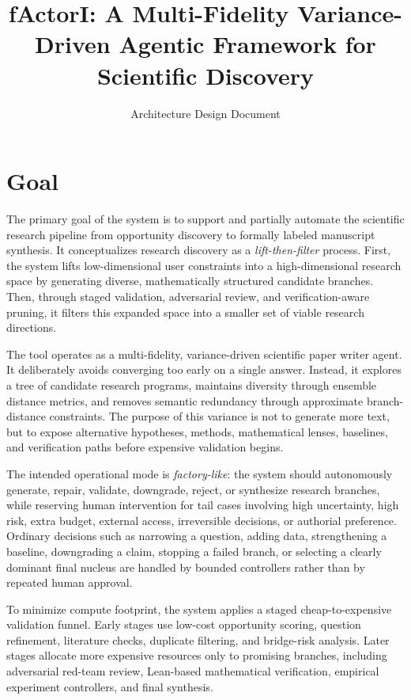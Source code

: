 \documentclass[11pt]{article}
\title{fActorI: A Multi-Fidelity Variance-Driven Agentic Framework for Scientific Discovery}
\author{Architecture Design Document}
\date{}
\begin{document}
\maketitle

\section{Goal}

The primary goal of the system is to support and partially automate the scientific research pipeline from opportunity discovery to formally labeled manuscript synthesis. It conceptualizes research discovery as a \emph{lift-then-filter} process. First, the system lifts low-dimensional user constraints into a high-dimensional research space by generating diverse, mathematically structured candidate branches. Then, through staged validation, adversarial review, and verification-aware pruning, it filters this expanded space into a smaller set of viable research directions.

The tool operates as a multi-fidelity, variance-driven scientific paper writer agent. It deliberately avoids converging too early on a single answer. Instead, it explores a tree of candidate research programs, maintains diversity through ensemble distance metrics, and removes semantic redundancy through approximate branch-distance constraints. The purpose of this variance is not to generate more text, but to expose alternative hypotheses, methods, mathematical lenses, baselines, and verification paths before expensive validation begins.

The intended operational mode is \emph{factory-like}: the system should autonomously generate, repair, validate, downgrade, reject, or synthesize research branches, while reserving human intervention for tail cases involving high uncertainty, high risk, extra budget, external access, irreversible decisions, or authorial preference. Ordinary decisions such as narrowing a question, adding data, strengthening a baseline, downgrading a claim, stopping a failed branch, or selecting a clearly dominant final nucleus are handled by bounded controllers rather than by repeated human approval.

To minimize compute footprint, the system applies a staged cheap-to-expensive validation funnel. Early stages use low-cost opportunity scoring, question refinement, literature checks, duplicate filtering, and bridge-risk analysis. Later stages allocate more expensive resources only to promising branches, including adversarial red-team review, Lean-based mathematical verification, empirical experiment controllers, and final synthesis.
\end{document}
